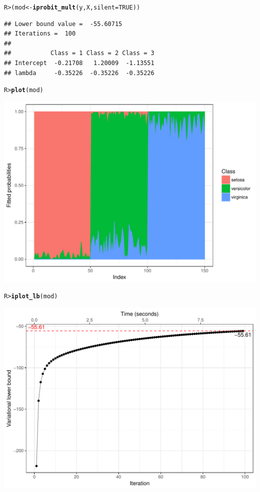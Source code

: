 \documentclass{article}\usepackage[]{graphicx}\usepackage[]{color}
\makeatletter
\def\maxwidth{ %
  \ifdim\Gin@nat@width>\linewidth
    \linewidth
  \else
    \Gin@nat@width
  \fi
}
\newcommand{\hlnum}[1]{\textcolor[rgb]{0.686,0.059,0.569}{#1}}%
\newcommand{\hlstd}[1]{\textcolor[rgb]{0.345,0.345,0.345}{#1}}%
\newcommand{\hlkwb}[1]{\textcolor[rgb]{0.69,0.353,0.396}{#1}}%
\newcommand{\hlkwc}[1]{\textcolor[rgb]{0.333,0.667,0.333}{#1}}%
\newcommand{\hlkwd}[1]{\textcolor[rgb]{0.737,0.353,0.396}{\textbf{#1}}}%
\newenvironment{kframe}{%
 \def\at@end@of@kframe{}%
 \ifinner\ifhmode%
  \def\at@end@of@kframe{\end{minipage}}%
  \begin{minipage}{\columnwidth}%
 \fi\fi%
 \def\FrameCommand##1{\hskip\@totalleftmargin \hskip-\fboxsep
 \colorbox{shadecolor}{##1}\hskip-\fboxsep
     \hskip-\linewidth \hskip-\@totalleftmargin \hskip\columnwidth}%
 \MakeFramed {\advance\hsize-\width
   \@totalleftmargin\z@ \linewidth\hsize
   \@setminipage}}%
 {\par\unskip\endMakeFramed%
 \at@end@of@kframe}
\newenvironment{knitrout}{}{} %
\makeatother
\begin{document}
\begin{knitrout}\small
{}\color{fgcolor}\begin{kframe}
\begin{alltt}
\hlstd{R> }\hlstd{(mod} \hlkwb{<-} \hlkwd{iprobit_mult}\hlstd{(y, X,} \hlkwc{silent} \hlstd{=} \hlnum{TRUE}\hlstd{))}
\end{alltt}
\begin{verbatim}
## Lower bound value =  -55.60715 
## Iterations =  100 
## 
##           Class = 1 Class = 2 Class = 3
## Intercept  -0.21708   1.20009  -1.13551
## lambda     -0.35226  -0.35226  -0.35226
\end{verbatim}
\begin{alltt}
\hlstd{R> }\hlkwd{plot}\hlstd{(mod)}
\end{alltt}
\end{kframe}

{\centering \includegraphics[width=\maxwidth]{figure/iris_mod-1} 

}


\begin{kframe}\begin{alltt}
\hlstd{R> }\hlkwd{iplot_lb}\hlstd{(mod)}
\end{alltt}
\end{kframe}

{\centering \includegraphics[width=\maxwidth]{figure/iris_mod-2} 

}
\end{knitrout}
\end{document}

